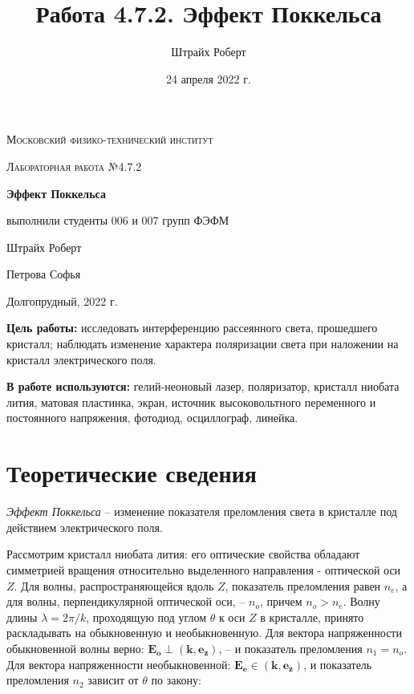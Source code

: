 \documentclass[a4paper, 12pt]{article}
\author{Штрайх Роберт}
\title{Работа 4.7.2. Эффект Поккельса}
\date{24 апреля 2022 г.}
\begin{document}
\begin{titlepage}
	\centering
	\vspace{5cm}
	{\scshape\LARGE Московский физико-технический институт \par}
	\vspace{4cm}
	{\scshape\Large Лабораторная работа №4.7.2 \par}
	\vspace{1cm}
	{\huge\bfseries Эффект Поккельса\par}
	\vspace{1cm}
	\vfill
\begin{flushright}
  {\Large выполнили студенты 006 и 007 групп ФЭФМ}\par
	\vspace{0.3cm}
	{\Large Штрайх Роберт}\par
	\vspace{0.3cm}
	{\Large Петрова Софья}\par
\end{flushright}


	\vfill

	Долгопрудный, 2022 г.
\end{titlepage}

\newpage

\textbf{Цель работы:} исследовать интерференцию рассеянного света, прошедшего кристалл; наблюдать изменение характера поляризации света при наложении на кристалл электрического поля.

\textbf{В работе используются:} гелий-неоновый лазер, поляризатор, кристалл ниобата лития, матовая пластинка, экран, источник высоковольтного переменного и постоянного напряжения, фотодиод, осциллограф, линейка.

\section{Теоретические сведения}

\textit{Эффект Поккельса} -- изменение показателя преломления света в кристалле под действием электрического поля.

Рассмотрим кристалл ниобата лития: его оптические свойства обладают симметрией вращения относительно выделенного направления - оптической оси $Z$. Для волны, распространяющейся вдоль $Z$, показатель преломления равен $n_e$, а для волны, перпендикулярной оптической оси, -- $n_o$, причем $n_o > n_e$. Волну длины $\lambda = 2\pi/k$, проходящую под углом $\theta$ к оси $Z$ в кристалле, принято раскладывать на обыкновенную и необыкновенную. Для вектора напряженности обыкновенной волны верно: $\mathbf{E_o} \perp (\mathbf{k}, \mathbf{e_z})$, -- и показатель преломления $n_1 = n_o$. Для вектора напряженности необыкновенной: $\mathbf{E_e} \in (\mathbf{k}, \mathbf{e_z})$, и показатель преломления $n_2$ зависит от $\theta$ по закону:
\end{document}
